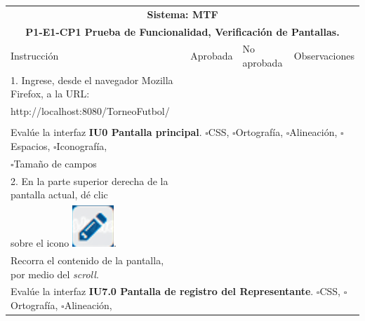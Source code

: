 \documentclass[oneside,10pt]{book}
\begin{document}
\begin{tabularx}{\textwidth}{ l l l X }
\multicolumn{4}{c}{\cellcolor[HTML]{9B9B9B}\textbf{Sistema: MTF}}                                                                                     \\
\multicolumn{4}{c}{\cellcolor[HTML]{EFEFEF}\textbf{P1-E1-CP1 Prueba de Funcionalidad, Verificación de Pantallas.}}                                    \\ \hline
\multicolumn{1}{|l|}{Instrucción}                               & \multicolumn{1}{l|}{Aprobada} & \multicolumn{1}{l|}{No aprobada} & \multicolumn{1}{X|}{Observaciones} \\ \hline
\multicolumn{1}{|l|}{1. Ingrese, desde el navegador Mozilla Firefox, a la URL:} & \multicolumn{1}{l|}{}   & \multicolumn{1}{l|}{}   & \multicolumn{1}{X|}{}              \\
\multicolumn{1}{|l|}{http://localhost:8080/TorneoFutbol/} & \multicolumn{1}{l|}{ } & \multicolumn{1}{l|}{ } & \multicolumn{1}{X|}{ } \\ 
\multicolumn{1}{|l|}{ } & \multicolumn{1}{l|}{ } & \multicolumn{1}{l|}{ } & \multicolumn{1}{X|}{ } \\ \hline
\multicolumn{4}{|l|}{Evalúe la interfaz \textbf{IU0 Pantalla principal}. $\square$CSS, $\square$Ortografía, $\square$Alineación, $\square$Espacios, $\square$Iconografía,}                        \\
\multicolumn{4}{|l|}{$\square$Tamaño de campos}                        \\ \hline
\multicolumn{1}{|l|}{2. En la parte superior derecha de la pantalla actual, dé clic} & \multicolumn{1}{l|}{}   & \multicolumn{1}{l|}{ }   & \multicolumn{1}{X|}{}              \\
\multicolumn{1}{|l|}{sobre el icono \includegraphics[scale=.3]{images/signin}.} & \multicolumn{1}{l|}{ } & \multicolumn{1}{l|}{ } & \multicolumn{1}{X|}{ } \\
\multicolumn{1}{|l|}{Recorra el contenido de la pantalla, por medio del \textit{scroll}.} & \multicolumn{1}{l|}{ } & \multicolumn{1}{l|}{ } & \multicolumn{1}{X|}{ } \\ \hline
\multicolumn{4}{|l|}{Evalúe la interfaz \textbf{IU7.0 Pantalla de registro del Representante}. $\square$CSS, $\square$Ortografía, $\square$Alineación,}                        \\

\end{tabularx}
\end{document}
